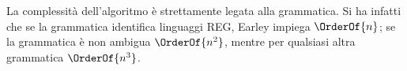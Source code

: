 \documentclass{subfiles}
\begin{document}
La complessità dell'algoritmo è strettamente legata alla grammatica.
Si ha infatti che se la grammatica identifica linguaggi REG, Earley impiega \(\OrderOf{n}\);
se la grammatica è non ambigua \(\OrderOf{n^{2}}\), mentre per qualsiasi altra grammatica \(\OrderOf{n^{3}}\).
\end{document}
